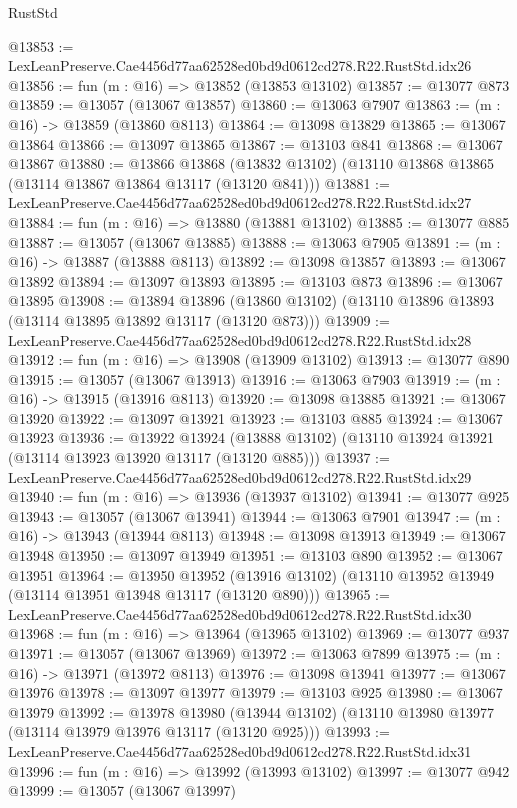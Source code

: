\begin{lexlean}{RustStd}
\begin{coremodule}
@13853 := LexLeanPreserve.Cae4456d77aa62528ed0bd9d0612cd278.R22.RustStd.idx26
@13856 := fun (m : @16) => @13852 (@13853 @13102)
@13857 := @13077 @873
@13859 := @13057 (@13067 @13857)
@13860 := @13063 @7907
@13863 := (m : @16) -> @13859 (@13860 @8113)
@13864 := @13098 @13829
@13865 := @13067 @13864
@13866 := @13097 @13865
@13867 := @13103 @841
@13868 := @13067 @13867
@13880 := @13866
    @13868
    (@13832 @13102)
    (@13110 @13868 @13865 (@13114 @13867 @13864 @13117 (@13120 @841)))
@13881 := LexLeanPreserve.Cae4456d77aa62528ed0bd9d0612cd278.R22.RustStd.idx27
@13884 := fun (m : @16) => @13880 (@13881 @13102)
@13885 := @13077 @885
@13887 := @13057 (@13067 @13885)
@13888 := @13063 @7905
@13891 := (m : @16) -> @13887 (@13888 @8113)
@13892 := @13098 @13857
@13893 := @13067 @13892
@13894 := @13097 @13893
@13895 := @13103 @873
@13896 := @13067 @13895
@13908 := @13894
    @13896
    (@13860 @13102)
    (@13110 @13896 @13893 (@13114 @13895 @13892 @13117 (@13120 @873)))
@13909 := LexLeanPreserve.Cae4456d77aa62528ed0bd9d0612cd278.R22.RustStd.idx28
@13912 := fun (m : @16) => @13908 (@13909 @13102)
@13913 := @13077 @890
@13915 := @13057 (@13067 @13913)
@13916 := @13063 @7903
@13919 := (m : @16) -> @13915 (@13916 @8113)
@13920 := @13098 @13885
@13921 := @13067 @13920
@13922 := @13097 @13921
@13923 := @13103 @885
@13924 := @13067 @13923
@13936 := @13922
    @13924
    (@13888 @13102)
    (@13110 @13924 @13921 (@13114 @13923 @13920 @13117 (@13120 @885)))
@13937 := LexLeanPreserve.Cae4456d77aa62528ed0bd9d0612cd278.R22.RustStd.idx29
@13940 := fun (m : @16) => @13936 (@13937 @13102)
@13941 := @13077 @925
@13943 := @13057 (@13067 @13941)
@13944 := @13063 @7901
@13947 := (m : @16) -> @13943 (@13944 @8113)
@13948 := @13098 @13913
@13949 := @13067 @13948
@13950 := @13097 @13949
@13951 := @13103 @890
@13952 := @13067 @13951
@13964 := @13950
    @13952
    (@13916 @13102)
    (@13110 @13952 @13949 (@13114 @13951 @13948 @13117 (@13120 @890)))
@13965 := LexLeanPreserve.Cae4456d77aa62528ed0bd9d0612cd278.R22.RustStd.idx30
@13968 := fun (m : @16) => @13964 (@13965 @13102)
@13969 := @13077 @937
@13971 := @13057 (@13067 @13969)
@13972 := @13063 @7899
@13975 := (m : @16) -> @13971 (@13972 @8113)
@13976 := @13098 @13941
@13977 := @13067 @13976
@13978 := @13097 @13977
@13979 := @13103 @925
@13980 := @13067 @13979
@13992 := @13978
    @13980
    (@13944 @13102)
    (@13110 @13980 @13977 (@13114 @13979 @13976 @13117 (@13120 @925)))
@13993 := LexLeanPreserve.Cae4456d77aa62528ed0bd9d0612cd278.R22.RustStd.idx31
@13996 := fun (m : @16) => @13992 (@13993 @13102)
@13997 := @13077 @942
@13999 := @13057 (@13067 @13997)

\end{coremodule}
\end{lexlean}
